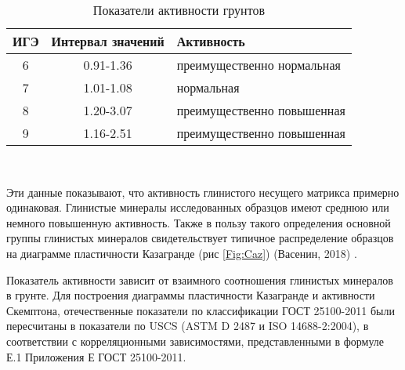 \begin{table}[]
    \centering
    \caption{Показатели активности грунтов} \label{tab:ak}
    \begin{tabular}{@{}ccl@{}}
    \toprule
    ИГЭ & Интервал значений & Активность\\ \midrule
    6	& 0.91-1.36	&  преимущественно нормальная  \\
    7	& 1.01-1.08	&  нормальная  \\
    8	& 1.20-3.07	&  преимущественно повышенная 	 \\
    9	& 1.16-2.51	& преимущественно повышенная\\ \bottomrule
    \end{tabular}
    \\ 
\end{table}
    

Эти данные показывают, что активность глинистого несущего матрикса примерно одинаковая. Глинистые минералы исследованных образцов имеют среднюю или немного повышенную активность.
Также в пользу такого определения основной группы глинистых минералов свидетельствует типичное распределение образцов на диаграмме пластичности Казагранде (рис \ref{Fig:Caz}) (Васенин, 2018) \cite{vasenin2018}.

Показатель активности зависит от взаимного соотношения глинистых минералов в грунте.
Для построения диаграммы пластичности Казагранде и активности Скемптона, отечественные показатели по классификации ГОСТ 25100-2011 были пересчитаны в показатели по USCS (ASTM D 2487 и ISO 14688-2:2004), 
в соответствии с корреляционными зависимостями, представленными в формуле Е.1 Приложения Е ГОСТ 25100-2011.








